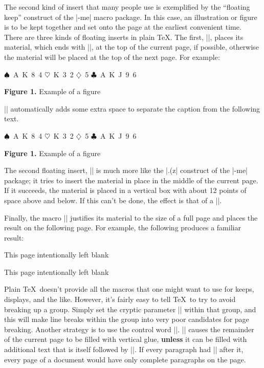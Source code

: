 The second kind of insert that many people use is exemplified by
the ``floating keep'' construct of the |-me| macro package.  In this
case, an illustration or figure is to be kept together and set
onto the page at the earliest convenient time.  There are three
kinds of floating inserts in plain \TeX.  The first, |\topinsert|,
places its material, which ends with |\endinsert|,
at the top of the current page, if possible,
otherwise the material will be placed at the top of the next page.
For example:
\nobreak
\begintt
\topinsert
   \centerline{\vbox{
      \hbox{$\spadesuit$ A K 8 4}
      \hbox{$\heartsuit$ K 3 2}
      \hbox{$\diamondsuit$ 5}
      \hbox{$\clubsuit$ A K J 9 6}
   }}
\vskip 12pt
\centerline{{\bf Figure 1.} Example of a figure}
\endinsert
\endtt
|\topinsert| automatically adds some extra space to separate
the caption from the following text.
\topinsert
   \centerline{\vbox{
      \hbox{$\spadesuit$ A K 8 4}
      \hbox{$\heartsuit$ K 3 2}
      \hbox{$\diamondsuit$ 5}
      \hbox{$\clubsuit$ A K J 9 6}
   }}
\vskip 12pt
\centerline{{\bf Figure 1.} Example of a figure}
\endinsert

The second floating insert, |\midinsert| is much more like the |.(z|
construct of the |-me| package; it tries to insert the material in place
in the middle of the current page.  If it succeeds, the material
is placed in a vertical box with about 12 points of space above and below.
If this can't be done, the effect is that of a |\topinsert|.

Finally, the macro |\pageinsert| justifies its material to the size
of a full page and places the result on the following page.  For
example, the following produces a familiar result:
\nobreak
\begintt
\pageinsert
   \vfil %
   \centerline{This page intentionally left blank}
   \vfil %
\endinsert
\endtt
\pageinsert
   \vfil %
   \centerline{This page intentionally left blank}
   \vfil %
\endinsert
{}
Plain \TeX\ doesn't provide all the macros that one might want
to use for keeps, displays, and the like.  However, it's fairly
easy to tell \TeX\ to try to avoid breaking up a group.  Simply
set the cryptic parameter || within that
group, and this will make line breaks within the group into very poor
candidates for page breaking.  Another strategy is to use
the control word |\filbreak|.  |\filbreak| causes the remainder
of the current page to be filled with vertical glue, {\bf unless}
it can be filled with additional text that is itself followed
by |\filbreak|.  If every paragraph had |\filbreak| after it, 
every page of a document would have only complete paragraphs on the
page.

